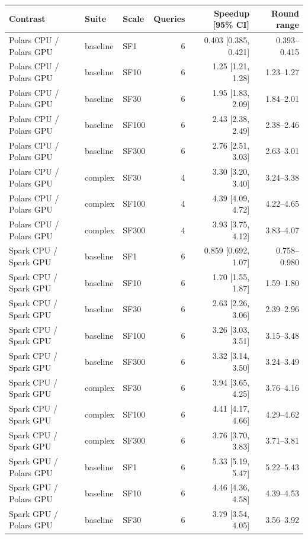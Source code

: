 \begin{tabular}{lllrrr}
\toprule
Contrast & Suite & Scale & Queries & Speedup [95\% CI] & Round range \\
\midrule
Polars CPU / Polars GPU & baseline & SF1 & 6 & 0.403 [0.385, 0.421] & 0.393--0.415 \\
Polars CPU / Polars GPU & baseline & SF10 & 6 & 1.25 [1.21, 1.28] & 1.23--1.27 \\
Polars CPU / Polars GPU & baseline & SF30 & 6 & 1.95 [1.83, 2.09] & 1.84--2.01 \\
Polars CPU / Polars GPU & baseline & SF100 & 6 & 2.43 [2.38, 2.49] & 2.38--2.46 \\
Polars CPU / Polars GPU & baseline & SF300 & 6 & 2.76 [2.51, 3.03] & 2.63--3.01 \\
Polars CPU / Polars GPU & complex & SF30 & 4 & 3.30 [3.20, 3.40] & 3.24--3.38 \\
Polars CPU / Polars GPU & complex & SF100 & 4 & 4.39 [4.09, 4.72] & 4.22--4.65 \\
Polars CPU / Polars GPU & complex & SF300 & 4 & 3.93 [3.75, 4.12] & 3.83--4.07 \\
Spark CPU / Spark GPU & baseline & SF1 & 6 & 0.859 [0.692, 1.07] & 0.758--0.980 \\
Spark CPU / Spark GPU & baseline & SF10 & 6 & 1.70 [1.55, 1.87] & 1.59--1.80 \\
Spark CPU / Spark GPU & baseline & SF30 & 6 & 2.63 [2.26, 3.06] & 2.39--2.96 \\
Spark CPU / Spark GPU & baseline & SF100 & 6 & 3.26 [3.03, 3.51] & 3.15--3.48 \\
Spark CPU / Spark GPU & baseline & SF300 & 6 & 3.32 [3.14, 3.50] & 3.24--3.49 \\
Spark CPU / Spark GPU & complex & SF30 & 6 & 3.94 [3.65, 4.25] & 3.76--4.16 \\
Spark CPU / Spark GPU & complex & SF100 & 6 & 4.41 [4.17, 4.66] & 4.29--4.62 \\
Spark CPU / Spark GPU & complex & SF300 & 6 & 3.76 [3.70, 3.83] & 3.71--3.81 \\
Spark GPU / Polars GPU & baseline & SF1 & 6 & 5.33 [5.19, 5.47] & 5.22--5.43 \\
Spark GPU / Polars GPU & baseline & SF10 & 6 & 4.46 [4.36, 4.58] & 4.39--4.53 \\
Spark GPU / Polars GPU & baseline & SF30 & 6 & 3.79 [3.54, 4.05] & 3.56--3.92 \\

\end{tabular}
